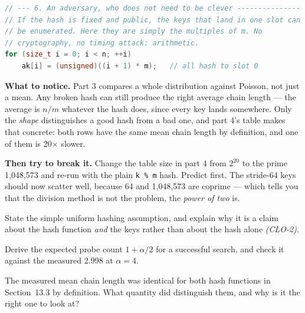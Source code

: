 \begin{lab}
\begin{lstlisting}[language=C++]
// --- 6. An adversary, who does not need to be clever ---------------
// If the hash is fixed and public, the keys that land in one slot can
// be enumerated. Here they are simply the multiples of m. No
// cryptography, no timing attack: arithmetic.
for (size_t i = 0; i < n; ++i)
    ak[i] = (unsigned)((i + 1) * m);   // all hash to slot 0
\end{lstlisting}

\textbf{What to notice.} Part 3 compares a whole distribution against Poisson,
not just a mean. Any broken hash can still produce the right average chain
length --- the average is $n/m$ whatever the hash does, since every key lands
somewhere. Only the \emph{shape} distinguishes a good hash from a bad one, and
part 4's table makes that concrete: both rows have the same mean chain length
by definition, and one of them is 20$\times$ slower.

\smallskip
\textbf{Then try to break it.} Change the table size in part 4 from $2^{20}$ to
the prime 1{,}048{,}573 and re-run with the plain \texttt{k \% m} hash. Predict
first. The stride-64 keys should now scatter well, because 64 and 1{,}048{,}573
are coprime --- which tells you that the division method is not the problem,
the \emph{power of two} is.
\end{lab}

\begin{checkpoint}
\begin{tightnum}
  \item State the simple uniform hashing assumption, and explain why it is a
        claim about the hash function \emph{and} the keys rather than about the
        hash alone \emph{(CLO-2)}.
  \item Derive the expected probe count $1 + \alpha/2$ for a successful search,
        and check it against the measured 2.998 at $\alpha = 4$.
  \item The measured mean chain length was identical for both hash functions in
        Section~13.3 by definition. What quantity did distinguish them, and
        why is it the right one to look at?
\end{tightnum}
\end{checkpoint}

